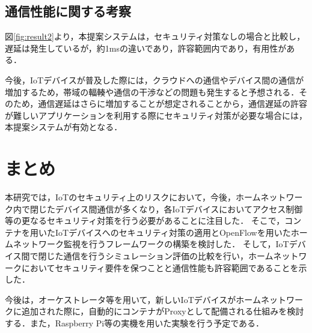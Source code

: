 \documentclass[Japanese]{dicomopapers}
\begin{document}
\subsection{通信性能に関する考察}
図\ref{fig:result2}より，本提案システムは，セキュリティ対策なしの場合と比較し，遅延は発生しているが，約1msの違いであり，許容範囲内であり，有用性がある．\par
今後，IoTデバイスが普及した際には，クラウドへの通信やデバイス間の通信が増加するため，帯域の輻輳や通信の干渉などの問題も発生すると予想される．そのため，通信遅延はさらに増加することが想定されることから，通信遅延の許容が難しいアプリケーションを利用する際にセキュリティ対策が必要な場合には，本提案システムが有効となる．

\section{まとめ}
本研究では，IoTのセキュリティ上のリスクにおいて，今後，ホームネットワーク内で閉じたデバイス間通信が多くなり，各IoTデバイスにおいてアクセス制御等の更なるセキュリティ対策を行う必要があることに注目した．
そこで，コンテナを用いたIoTデバイスへのセキュリティ対策の適用とOpenFlowを用いたホームネットワーク監視を行うフレームワークの構築を検討した．
そして，IoTデバイス間で閉じた通信を行うシミュレーション評価の比較を行い，ホームネットワークにおいてセキュリティ要件を保つことと通信性能も許容範囲であることを示した．\par
今後は，オーケストレータ等を用いて，新しいIoTデバイスがホームネットワークに追加された際に，自動的にコンテナがProxyとして配備される仕組みを検討する．また，Raspberry Pi等の実機を用いた実験を行う予定である．
\end{document}

